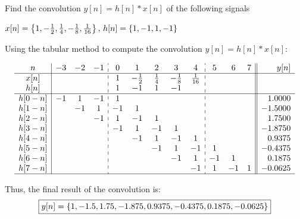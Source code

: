 \documentclass[a4paper, 10pt]{article}
\begin{document}
\newpage

\begin{problem}
    Find the convolution \( y[n] = h[n] * x[n] \) of the following signals
\end{problem}

\begin{subproblems}[start=1]
    \item \( x[n] = \left\{ 1, -\frac{1}{2}, \frac{1}{4}, -\frac{1}{8}, \frac{1}{16} \right\},\, h[n] = \left\{ 1, -1, 1, -1 \right\} \)
\end{subproblems}

\begin{solution}
Using the tabular method to compute the convolution \( y[n] = h[n] * x[n] \):

\renewcommand{\arraystretch}{1.3}
\[
\begin{array}{c|ccc:ccccc:ccc||r}
n  & -3 & -2 & -1 & 0 & 1 & 2 & 3 & 4 & 5 & 6 & 7 & y[n] \\
\hline
x[n] &  &  &  & 1 & -\frac{1}{2} & \frac{1}{4} & -\frac{1}{8} & \frac{1}{16} &  &  &  &  \\
h[n] &  &  &  & 1 & -1 & 1 & -1 &  &  &  &  &  \\
\hline
h[0-n] & -1 & 1 & -1 & 1 &  &  &  &  &  &  &  & 1.0000 \\
h[1-n] &  & -1 & 1 & -1 & 1 &  &  &  &  &  &  & -1.5000 \\
h[2-n] &  &  & -1 & 1 & -1 & 1 &  &  &  &  &  & 1.7500 \\
h[3-n] &  &  &  & -1 & 1 & -1 & 1 &  &  &  &  & -1.8750 \\
h[4-n] &  &  &  &  & -1 & 1 & -1 & 1 &  &  &  & 0.9375 \\
h[5-n] &  &  &  &  &  & -1 & 1 & -1 & 1 &  &  & -0.4375 \\
h[6-n] &  &  &  &  &  &  & -1 & 1 & -1 & 1 &  & 0.1875 \\
h[7-n] &  &  &  &  &  &  &  & -1 & 1 & -1 & 1 & -0.0625 \\
\hline
\end{array}
\]

Thus, the final result of the convolution is:
\[ \boxed{ y[n] = \left\{ 1, -1.5, 1.75, -1.875, 0.9375, -0.4375, 0.1875, -0.0625 \right\} } \]
\end{solution}
\end{document}
